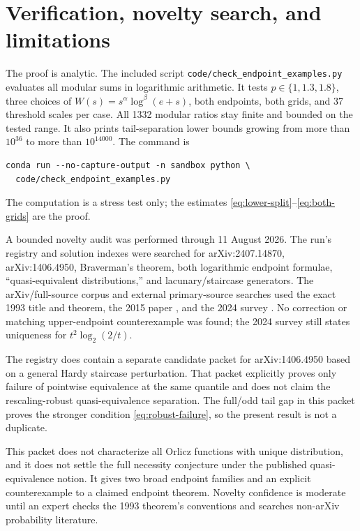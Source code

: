 \documentclass[11pt]{article}
\theoremstyle{definition}
\theoremstyle{remark}
\begin{document}
\section{Verification, novelty search, and limitations}

The proof is analytic.  The included script
\texttt{code/check\_endpoint\_examples.py} evaluates all modular sums in
logarithmic arithmetic.  It tests $p\in\{1,1.3,1.8\}$, three choices of
$W(s)=s^\alpha\log^\beta(e+s)$, both endpoints, both grids, and 37 threshold
scales per case.  All 1332 modular ratios stay finite and bounded on the
tested range.  It also prints tail-separation lower bounds growing from more
than $10^{36}$ to more than $10^{14000}$.  The command is
\begin{verbatim}
conda run --no-capture-output -n sandbox python \
  code/check_endpoint_examples.py
\end{verbatim}
The computation is a stress test only; the estimates
\eqref{eq:lower-split}--\eqref{eq:both-grids} are the proof.

A bounded novelty audit was performed through 11 August 2026.  The run's
registry and solution indexes were searched for arXiv:2407.14870,
arXiv:1406.4950, Braverman's theorem, both logarithmic endpoint formulae,
``quasi-equivalent distributions,'' and lacunary/staircase generators.  The
arXiv/full-source corpus and external primary-source searches used the exact
1993 title and theorem, the 2015 paper \cite{ASZ15}, and the 2024 survey
\cite{Ast24survey}.  No correction or matching upper-endpoint counterexample
was found; the 2024 survey still states uniqueness for
$t^2\log_2(2/t)$.

The registry does contain a separate candidate packet for arXiv:1406.4950
based on a general Hardy staircase perturbation.  That packet explicitly
proves only failure of pointwise equivalence at the same quantile and does not
claim the rescaling-robust quasi-equivalence separation.  The full/odd tail
gap in this packet proves the stronger condition \eqref{eq:robust-failure}, so
the present result is not a duplicate.

This packet does not characterize all Orlicz functions with unique
distribution, and it does not settle the full necessity conjecture under the
published quasi-equivalence notion.  It gives two broad endpoint families and
an explicit counterexample to a claimed endpoint theorem.  Novelty confidence
is moderate until an expert checks the 1993 theorem's conventions and searches
non-arXiv probability literature.
\end{document}
